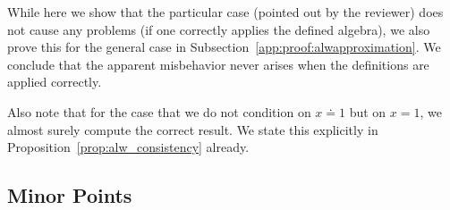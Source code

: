 \begin{enumerate}
{While here we show that the particular case (pointed out by the reviewer) does not cause any problems (if one correctly applies the defined algebra), we also prove this for the general case in Subsection~\ref{app:proof:alwapproximation}.
We conclude that the apparent misbehavior never arises when the definitions are applied correctly.

Also note that for the case that we do not condition on $x\doteq 1$ but on $x=1$, we almost surely compute the correct result. We state this explicitly in Proposition~\ref{prop:alw_consistency} already.
}


\end{enumerate}


\subsection{Minor Points}
